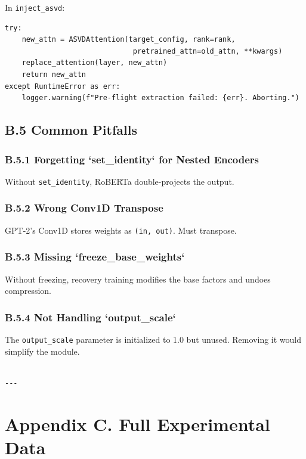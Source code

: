 In \texttt{inject\_asvd}:

\begin{lstlisting}
try:
    new_attn = ASVDAttention(target_config, rank=rank,
                              pretrained_attn=old_attn, **kwargs)
    replace_attention(layer, new_attn)
    return new_attn
except RuntimeError as err:
    logger.warning(f"Pre-flight extraction failed: {err}. Aborting.")
\end{lstlisting}

\subsection{B.5 Common Pitfalls}

\subsubsection{B.5.1 Forgetting `set\_identity` for Nested Encoders}

Without \texttt{set\_identity}, RoBERTa double-projects the output.

\subsubsection{B.5.2 Wrong Conv1D Transpose}

GPT-2's Conv1D stores weights as \texttt{(in, out)}. Must transpose.

\subsubsection{B.5.3 Missing `freeze\_base\_weights`}

Without freezing, recovery training modifies the base factors and undoes 
compression.

\subsubsection{B.5.4 Not Handling `output\_scale`}

The \texttt{output\_scale} parameter is initialized to 1.0 but unused. Removing 
it would simplify the module.
\begin{lstlisting}

---
\end{lstlisting}


\section{Appendix C. Full Experimental Data}

